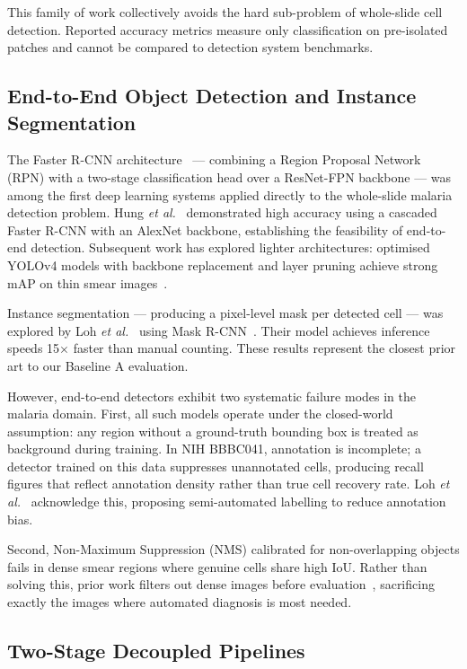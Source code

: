 \documentclass[10pt,twocolumn]{article}
\newcommand{\etal}{\textit{et al.}}
\begin{document}
This family of work collectively avoids the hard sub-problem of whole-slide
cell detection. Reported accuracy metrics measure only classification on
pre-isolated patches and cannot be compared to detection system benchmarks.

\subsection{End-to-End Object Detection and Instance Segmentation}
\label{ssec:e2e}

The Faster R-CNN architecture~\cite{ren2015} --- combining a Region Proposal
Network (RPN) with a two-stage classification head over a ResNet-FPN
backbone --- was among the first deep learning systems applied directly to
the whole-slide malaria detection problem. Hung \etal~\cite{hung2018}
demonstrated high accuracy using a cascaded Faster R-CNN with an AlexNet
backbone, establishing the feasibility of end-to-end detection. Subsequent
work has explored lighter architectures: optimised YOLOv4 models with
backbone replacement and layer pruning achieve strong mAP on thin
smear images~\cite{yolov4malaria2024}.

Instance segmentation --- producing a pixel-level mask per detected cell
--- was explored by Loh \etal~\cite{loh2021} using Mask R-CNN~\cite{he2017maskrcnn}.
Their model achieves inference speeds 15$\times$ faster than manual counting.
These results represent the closest prior art to our Baseline A evaluation.

However, end-to-end detectors exhibit two systematic failure modes in the
malaria domain. First, all such models operate under the closed-world
assumption: any region without a ground-truth bounding box is treated as
background during training. In NIH BBBC041, annotation is incomplete; a
detector trained on this data suppresses unannotated cells, producing recall
figures that reflect annotation density rather than true cell recovery rate.
Loh \etal~\cite{loh2021} acknowledge this, proposing semi-automated
labelling to reduce annotation bias.

Second, Non-Maximum Suppression (NMS) calibrated for non-overlapping objects
fails in dense smear regions where genuine cells share high IoU. Rather than
solving this, prior work filters out dense images before evaluation~\cite{loh2021},
sacrificing exactly the images where automated diagnosis is most needed.

\subsection{Two-Stage Decoupled Pipelines}
\label{ssec:twostage}
\end{document}
